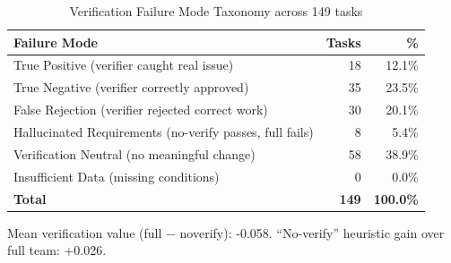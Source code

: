 \begin{table}[h]
\centering
\caption{Verification Failure Mode Taxonomy across 149 tasks}
\label{tab:verification_taxonomy}
\begin{tabular}{lrr}
\toprule
\textbf{Failure Mode} & \textbf{Tasks} & \textbf{\%} \\
\midrule
True Positive (verifier caught real issue) & 18 & 12.1\% \\
True Negative (verifier correctly approved) & 35 & 23.5\% \\
False Rejection (verifier rejected correct work) & 30 & 20.1\% \\
Hallucinated Requirements (no-verify passes, full fails) & 8 & 5.4\% \\
Verification Neutral (no meaningful change) & 58 & 38.9\% \\
Insufficient Data (missing conditions) & 0 & 0.0\% \\
\midrule
\textbf{Total} & \textbf{149} & \textbf{100.0\%} \\
\bottomrule
\end{tabular}

\smallskip
\noindent\small
Mean verification value (full $-$ no\textunderscore verify): -0.058. ``No-verify'' heuristic gain over full team: +0.026.
\end{table}
